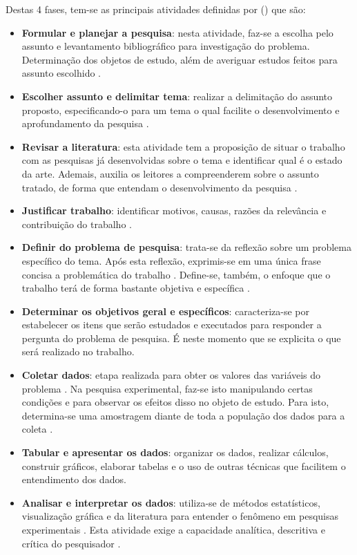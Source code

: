 Destas 4 fases, tem-se as principais atividades definidas por \citeauthor{PRODANOV2013} (\citeyear{PRODANOV2013}) que são:

\begin{itemize}
  \item \textbf{Formular e planejar a pesquisa}: nesta atividade, faz-se a escolha pelo assunto e levantamento bibliográfico para investigação do problema. Determinação dos objetos de estudo, além de averiguar estudos feitos para assunto escolhido \cite{PRODANOV2013}.
  \item \textbf{Escolher assunto e delimitar tema}: realizar a delimitação do assunto proposto, especificando-o para um tema o qual facilite o desenvolvimento e aprofundamento da pesquisa \cite{PRODANOV2013}.
  \item \textbf{Revisar a literatura}: esta atividade tem a proposição de situar o trabalho com as pesquisas já desenvolvidas sobre o tema e identificar qual é o estado da arte. Ademais, auxilia os leitores a compreenderem sobre o assunto tratado, de forma que entendam o desenvolvimento da pesquisa \cite{PRODANOV2013}.
  \item \textbf{Justificar trabalho}: identificar motivos, causas, razões da relevância e contribuição do trabalho \cite{PRODANOV2013}.
  \item \textbf{Definir do problema de pesquisa}: trata-se da reflexão sobre um problema específico do tema. Após esta reflexão, exprimis-se em uma única frase concisa a problemática do trabalho \cite{PRODANOV2013}. Define-se, também, o enfoque que o trabalho terá de forma bastante objetiva e específica \cite{GIL2002}.
  \item \textbf{Determinar os objetivos geral e específicos}: caracteriza-se por estabelecer os itens que serão estudados e executados para responder a pergunta do problema de pesquisa. É neste momento que se explicita o que será realizado no trabalho.
  \item \textbf{Coletar dados}: etapa realizada para obter os valores das variáveis do problema \cite{PRODANOV2013}. Na pesquisa experimental, faz-se isto manipulando certas condições e para observar os efeitos disso no objeto de estudo. Para isto, determina-se uma amostragem diante de toda a população dos dados para a coleta \cite{GIL2002}.
  \item \textbf{Tabular e apresentar os dados}: organizar os dados, realizar cálculos, construir gráficos, elaborar tabelas e o uso de outras técnicas que facilitem o entendimento dos dados.
  \item \textbf{Analisar e interpretar os dados}: utiliza-se de métodos estatísticos, visualização gráfica e da literatura para entender o fenômeno em pesquisas experimentais \cite{GIL2002}. Esta atividade exige a capacidade analítica, descritiva e crítica do pesquisador \cite{PRODANOV2013}.   

\end{itemize}
